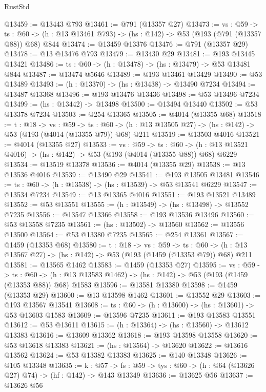 \begin{lexlean}{RustStd}
\begin{coremodule}
@13459 := @13443 @793
@13461 := @791 (@13357 @27)
@13473 := {vs : @59} ->
  {ts : @60} -> (h : @13 @13461 @793) -> (hs : @142) -> @53 (@193 (@791 (@13357 @88)) @68) @844
@13474 := @13459 @13376
@13476 := @791 (@13357 @29)
@13478 := @13 @13476 @793
@13479 := @13430 @29
@13481 := @193 @13445 @13421
@13486 := {ts : @60} -> (h : @13478) -> (hs : @13479) -> @53 @13481 @844
@13487 := @13474 @5646
@13489 := @193 @13461 @13429
@13490 := @53 @13489
@13493 := (h : @13370) -> (hs : @13438) -> @13490 @7234
@13494 := @13487 @13368
@13496 := @193 @13476 @13436
@13498 := @53 @13496 @7234
@13499 := (hs : @13442) -> @13498
@13500 := @13494 @13440
@13502 := @53 @13378 @7234
@13503 := @254 @13365
@13505 := @4014 (@13355 @68)
@13518 := {t : @18} ->
  {vs : @59} ->
  {ts : @60} -> (h : @13 @13505 @27) -> (hs : @142) -> @53 (@193 (@4014 (@13355 @79)) @68) @211
@13519 := @13503 @4016
@13521 := @4014 (@13355 @27)
@13533 := {vs : @59} ->
  {ts : @60} -> (h : @13 @13521 @4016) -> (hs : @142) -> @53 (@193 (@4014 (@13355 @88)) @68) @6229
@13534 := @13519 @13378
@13536 := @4014 (@13355 @29)
@13538 := @13 @13536 @4016
@13539 := @13490 @29
@13541 := @193 @13505 @13481
@13546 := {ts : @60} -> (h : @13538) -> (hs : @13539) -> @53 @13541 @6229
@13547 := @13534 @7234
@13549 := @13 @13365 @4016
@13551 := @193 @13521 @13489
@13552 := @53 @13551
@13555 := (h : @13549) -> (hs : @13498) -> @13552 @7235
@13556 := @13547 @13366
@13558 := @193 @13536 @13496
@13560 := @53 @13558 @7235
@13561 := (hs : @13502) -> @13560
@13562 := @13556 @13500
@13564 := @53 @13380 @7235
@13565 := @254 @13361
@13567 := @1459 (@13353 @68)
@13580 := {t : @18} ->
  {vs : @59} ->
  {ts : @60} -> (h : @13 @13567 @27) -> (hs : @142) -> @53 (@193 (@1459 (@13353 @79)) @68) @211
@13581 := @13565 @1462
@13583 := @1459 (@13353 @27)
@13595 := {vs : @59} ->
  {ts : @60} -> (h : @13 @13583 @1462) -> (hs : @142) -> @53 (@193 (@1459 (@13353 @88)) @68) @1583
@13596 := @13581 @13380
@13598 := @1459 (@13353 @29)
@13600 := @13 @13598 @1462
@13601 := @13552 @29
@13603 := @193 @13567 @13541
@13608 := {ts : @60} -> (h : @13600) -> (hs : @13601) -> @53 @13603 @1583
@13609 := @13596 @7235
@13611 := @193 @13583 @13551
@13612 := @53 @13611
@13615 := (h : @13364) -> (hs : @13560) -> @13612 @13383
@13616 := @13609 @13362
@13618 := @193 @13598 @13558
@13620 := @53 @13618 @13383
@13621 := (hs : @13564) -> @13620
@13622 := @13616 @13562
@13624 := @53 @13382 @13383
@13625 := @140 @13348
@13626 := @105 @13348
@13635 := {k : @57} ->
  {fs : @59} -> {tys : @60} -> (h : @64 (@13626 @27) @74) -> (hf : @142) -> @143 @13349
@13636 := @13625 @56
@13637 := @13626 @56

\end{coremodule}
\end{lexlean}
